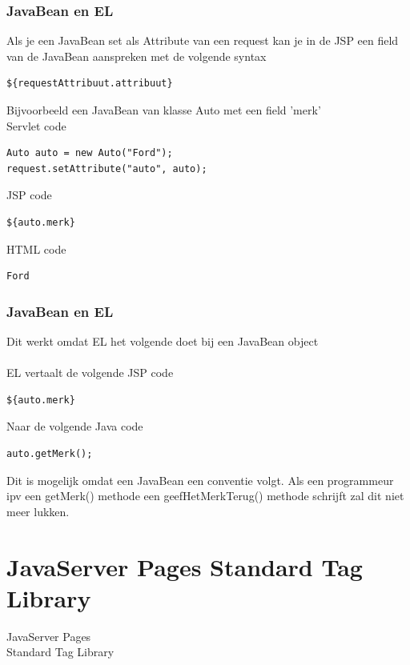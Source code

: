\documentclass{beamer}
\begin{document}
\begin{frame}[fragile]

\frametitle{JavaBean en EL}

Als je een JavaBean set als Attribute van een request kan je in
de JSP een field van de JavaBean aanspreken met de volgende syntax

\begin{verbatim}
${requestAttribuut.attribuut}
\end{verbatim}
Bijvoorbeeld een JavaBean van klasse Auto met een field 'merk'\\
Servlet code
\begin{verbatim}
Auto auto = new Auto("Ford");
request.setAttribute("auto", auto);
\end{verbatim}

JSP code
\begin{verbatim}
${auto.merk}
\end{verbatim}

HTML code
\begin{verbatim}
Ford
\end{verbatim}

\end{frame}


\begin{frame}[fragile]

\frametitle{JavaBean en EL}

Dit werkt omdat EL het volgende doet bij een JavaBean object\\~\\

EL vertaalt de volgende JSP code 
\begin{verbatim}
${auto.merk}
\end{verbatim}
Naar de volgende Java code
\begin{verbatim}
auto.getMerk();
\end{verbatim}

Dit is mogelijk omdat een JavaBean een conventie volgt. Als een programmeur
ipv een getMerk() methode een geefHetMerkTerug() methode schrijft zal dit
niet meer lukken.

\end{frame}


\section{JavaServer Pages Standard Tag Library}


\begin{frame}

JavaServer Pages\\Standard Tag Library

\end{frame}
\end{document}
